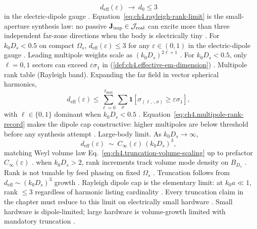\begin{equation}
\label{eq:ch4.rayleigh-rank-limit}
d_{\mathrm{eff}}(\varepsilon)\ \longrightarrow\ d_{0}\le3
\end{equation}
in the electric-dipole gauge \cite{rayleigh1871}. Equation~\eqref{eq:ch4.rayleigh-rank-limit} is the small-aperture synthesis law: no
passive \(\mathbf{J}_{\mathrm{imp}}\in\mathcal{J}_{\mathrm{real}}\) can excite more than three independent far-zone directions when the body is electrically tiny
\cite{stratton1941}.
\label{thm:ch4.rayleigh-dipole-cap}
For \(k_{0}D_{s}<0.5\) on compact \(\Omega_{s}\), \(d_{\mathrm{eff}}(\varepsilon)\le3\) for any \(\varepsilon\in(0,1)\) in the electric-dipole
gauge \cite{jackson1999}.
Leading multipole weights scale as \((k_{0}D_{s})^{2\ell+1}\) \cite{jackson1999}. For \(k_{0}D_{s}<0.5\), only \(\ell=0,1\) sectors can exceed
\(\varepsilon\sigma_{1}\) in (\ref{def:ch4.effective-em-dimension}) \cite{stratton1941}.
Multipole rank table (Rayleigh band). Expanding the far field in vector spherical harmonics,
\begin{equation}
\label{eq:ch4.multipole-rank-record}
d_{\mathrm{eff}}(\varepsilon)\le\sum_{\ell=0}^{\ell_{\max}}\sum_{\sigma}\mathbf{1}\!\left[\sigma_{(\ell,\cdot,\sigma)}\ge\varepsilon\sigma_{1}\right],
\end{equation}
with \(\ell\in\{0,1\}\) dominant when \(k_{0}D_{s}<0.5\) \cite{jackson1999}. Equation~\eqref{eq:ch4.multipole-rank-record}
makes the dipole cap constructive: higher multipoles are below threshold before any synthesis attempt \cite{harrington2001}.
Large-body limit. As \(k_{0}D_{s}\to\infty\),
\begin{equation}
\label{eq:ch4.large-body-rank-growth}
d_{\mathrm{eff}}(\varepsilon)\ \sim\ C_{\infty}(\varepsilon)\,(k_{0}D_{s})^{3},
\end{equation}
matching Weyl volume law Eq.~\eqref{eq:ch4.truncation-volume-scaling} up to prefactor \(C_{\infty}(\varepsilon)\) \cite{stratton1941}.
when \(k_{0}D_{s}>2\), rank increments track volume mode density on \(B_{D_{s}}\) \cite{stratton1941}. Rank is not tunable by
feed phasing on fixed \(\Omega_{s}\) \cite{devaney2004}. Truncation follows from
\(d_{\mathrm{eff}}\sim(k_{0}D_{s})^{3}\) growth \cite{hansen1988}.
Rayleigh dipole cap is the elementary limit: at $k_0 a\ll 1$, rank $\le 3$ regardless of harmonic listing cardinality \cite{jackson1999}. Every truncation claim in the chapter must reduce to this limit on electrically small hardware \cite{harrington2001}.
\label{cor:ch4.asymptotic-regimes}
Small hardware is dipole-limited; large hardware is volume-growth limited with mandatory truncation \cite{stratton1941}.
